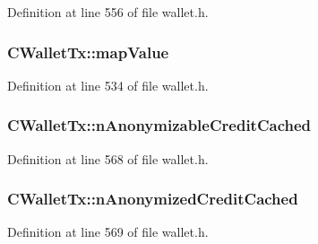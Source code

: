 Definition at line 556 of file wallet.\+h.

\hypertarget{class_c_wallet_tx_a17229eca0c81245312115a9c333203d8}{}
\subsubsection[{map\+Value}]{ C\+Wallet\+Tx\+::map\+Value}\label{class_c_wallet_tx_a17229eca0c81245312115a9c333203d8}


Definition at line 534 of file wallet.\+h.

\hypertarget{class_c_wallet_tx_ad68a73e3dde08f0f397147f825a09263}{}
\subsubsection[{n\+Anonymizable\+Credit\+Cached}]{ C\+Wallet\+Tx\+::n\+Anonymizable\+Credit\+Cached\hspace{0.3cm}{\ttfamily [mutable]}}\label{class_c_wallet_tx_ad68a73e3dde08f0f397147f825a09263}


Definition at line 568 of file wallet.\+h.

\hypertarget{class_c_wallet_tx_af181c96d03d064524fec21c2f8d6f1c1}{}
\subsubsection[{n\+Anonymized\+Credit\+Cached}]{ C\+Wallet\+Tx\+::n\+Anonymized\+Credit\+Cached\hspace{0.3cm}{\ttfamily [mutable]}}\label{class_c_wallet_tx_af181c96d03d064524fec21c2f8d6f1c1}


Definition at line 569 of file wallet.\+h.

\hypertarget{class_c_wallet_tx_a095729d9d744bb1a47d07952f8aa159e}{}

